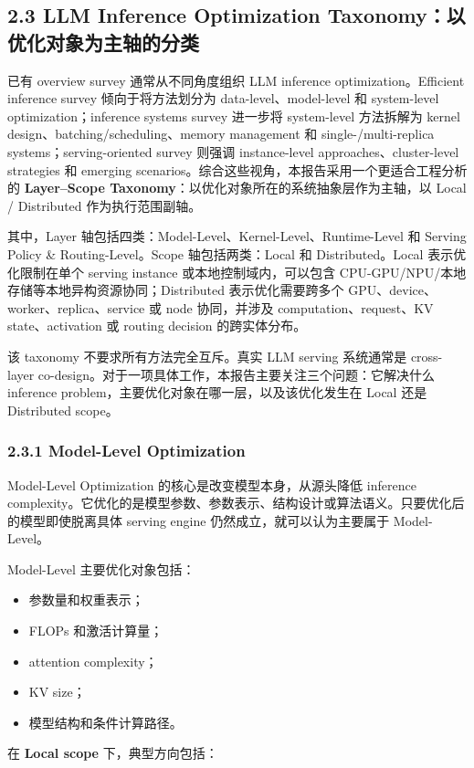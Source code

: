 \documentclass[a4paper,twocolumn,10pt]{ctexart}
\begin{document}
\subsection{2.3 LLM Inference Optimization Taxonomy：以优化对象为主轴的分类}

已有 overview survey 通常从不同角度组织 LLM inference optimization。Efficient inference survey 倾向于将方法划分为 data-level、model-level 和 system-level optimization；inference systems survey 进一步将 system-level 方法拆解为 kernel design、batching/scheduling、memory management 和 single-/multi-replica systems；serving-oriented survey 则强调 instance-level approaches、cluster-level strategies 和 emerging scenarios。综合这些视角，本报告采用一个更适合工程分析的 \textbf{Layer–Scope Taxonomy}：以优化对象所在的系统抽象层作为主轴，以 Local / Distributed 作为执行范围副轴。


其中，Layer 轴包括四类：Model-Level、Kernel-Level、Runtime-Level 和 Serving Policy \& Routing-Level。Scope 轴包括两类：Local 和 Distributed。Local 表示优化限制在单个 serving instance 或本地控制域内，可以包含 CPU-GPU/NPU/本地存储等本地异构资源协同；Distributed 表示优化需要跨多个 GPU、device、worker、replica、service 或 node 协同，并涉及 computation、request、KV state、activation 或 routing decision 的跨实体分布。


该 taxonomy 不要求所有方法完全互斥。真实 LLM serving 系统通常是 cross-layer co-design。对于一项具体工作，本报告主要关注三个问题：它解决什么 inference problem，主要优化对象在哪一层，以及该优化发生在 Local 还是 Distributed scope。




\subsubsection{2.3.1 Model-Level Optimization}

Model-Level Optimization 的核心是改变模型本身，从源头降低 inference complexity。它优化的是模型参数、参数表示、结构设计或算法语义。只要优化后的模型即使脱离具体 serving engine 仍然成立，就可以认为主要属于 Model-Level。


Model-Level 主要优化对象包括：


\begin{itemize}
\item 参数量和权重表示；

\item FLOPs 和激活计算量；

\item attention complexity；

\item KV size；

\item 模型结构和条件计算路径。

\end{itemize}
在 \textbf{Local scope} 下，典型方向包括：
\end{document}
